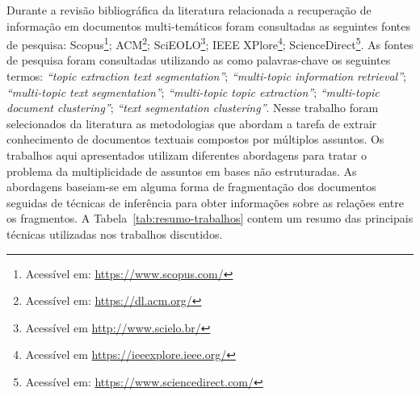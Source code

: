 




Durante a revisão bibliográfica da literatura relacionada a recuperação de informação em documentos multi-temáticos foram consultadas as seguintes fontes de pesquisa:
%
Scopus\footnote{Acessível em: \url{https://www.scopus.com/}}; 
ACM\footnote{Acessível em: \url{https://dl.acm.org/}}; 
SciEOLO\footnote{Acessível em \url{http://www.scielo.br/}};
IEEE XPlore\footnote{Acessível em \url{https://ieeexplore.ieee.org/}};
ScienceDirect\footnote{Acessível em: \url{https://www.sciencedirect.com/}}. 
%
% 
As fontes de pesquisa foram consultadas utilizando as como palavras-chave os seguintes termos:
\textit{``topic extraction text segmentation''}; 
\textit{``multi-topic information retrieval''}; 
\textit{``multi-topic text segmentation''}; 
\textit{``multi-topic topic extraction''}; 
\textit{``multi-topic document clustering''}; 
\textit{``text segmentation clustering''}.
%
Nesse trabalho foram selecionados da literatura as metodologias que abordam a tarefa de extrair conhecimento de documentos textuais compostos por múltiplos assuntos.
%
Os trabalhos aqui apresentados utilizam diferentes abordagens para tratar o problema da multiplicidade de assuntos em bases não estruturadas. As abordagens baseiam-se em alguma forma de fragmentação dos documentos seguidas de técnicas de inferência para obter informações sobre as relações entre os fragmentos. A Tabela~\ref{tab:resumo-trabalhos} contem um resumo das principais técnicas utilizadas nos trabalhos discutidos.

